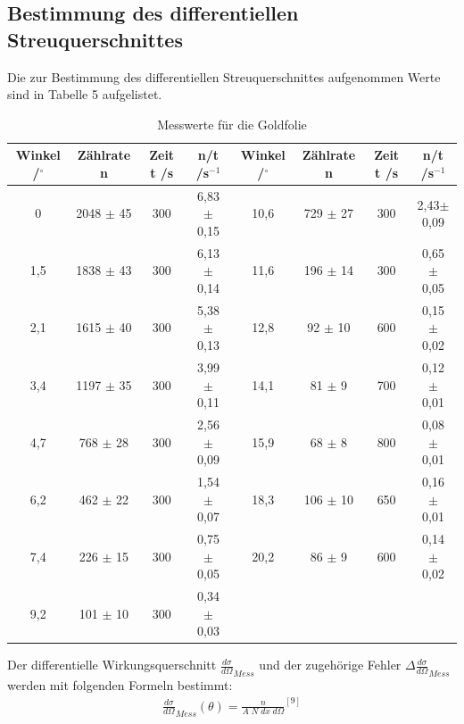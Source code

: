 \documentclass{article}
\begin{document}
\subsection{Bestimmung des differentiellen Streuquerschnittes}

Die zur Bestimmung des differentiellen Streuquerschnittes aufgenommen Werte sind in Tabelle 5 aufgelistet. 

\begin{table}[H] 
	\centering
	\begin{tabular}{c c c c|c c c c}
		
		Winkel /$^{\circ}$  & Zählrate n  & Zeit t /s   & n/t /s$^{-1}$ & Winkel  /$^{\circ}$  & Zählrate n  & Zeit t /s  & n/t /s$^{-1}$ \\ 
		\hline 
		0 & 2048 $\pm$ 45 & 300 & 6,83 $\pm$ 0,15& 10,6 & 729 $\pm$ 27& 300& 2,43$\pm$ 0,09\\ 
		
		1,5 & 1838 $\pm$ 43 & 300 & 6,13 $\pm$ 0,14  & 11,6 & 196 $\pm$ 14 & 300 & 0,65 $\pm$ 0,05\\ 
		
		2,1 & 1615 $\pm$ 40  & 300 & 5,38 $\pm$ 0,13& 12,8 & 92 $\pm$ 10 & 600 & 0,15 $\pm$ 0,02\\ 
		
		3,4 & 1197 $\pm$ 35 & 300 & 3,99 $\pm$ 0,11 & 14,1 & 81 $\pm$ 9 & 700  & 0,12 $\pm$ 0,01\\ 
		
		4,7 & 768  $\pm$ 28 & 300 & 2,56 $\pm$ 0,09 & 15,9 & 68 $\pm$ 8 & 800 & 0,08 $\pm$ 0,01 \\ 
		
		6,2& 462 $\pm$ 22 & 300 & 1,54 $\pm$ 0,07& 18,3& 106 $\pm$ 10 & 650 & 0,16 $\pm$ 0,01 \\ 
		
		7,4& 226 $\pm$ 15 & 300 & 0,75 $\pm$ 0,05& 20,2& 86  $\pm$ 9&600 & 0,14 $\pm$ 0,02\\ 
		
		9,2& 101 $\pm$ 10 & 300& 0,34 $\pm$ 0,03
		
		
		
	\end{tabular} 
	\caption{Messwerte für die Goldfolie} 
\end{table}
Der differentielle Wirkungsquerschnitt $\frac{d\sigma}{d\Omega}_{Mess}$ und der zugehörige Fehler $\Delta\frac{d\sigma}{d\Omega}_{Mess}$ werden mit folgenden Formeln bestimmt: 
\begin{align}
\frac{d\sigma}{d\Omega}_{Mess} (\theta)= \frac{n}{A \; N \; dx \; d\Omega}^{[9]}
\end{align}
\end{document}
